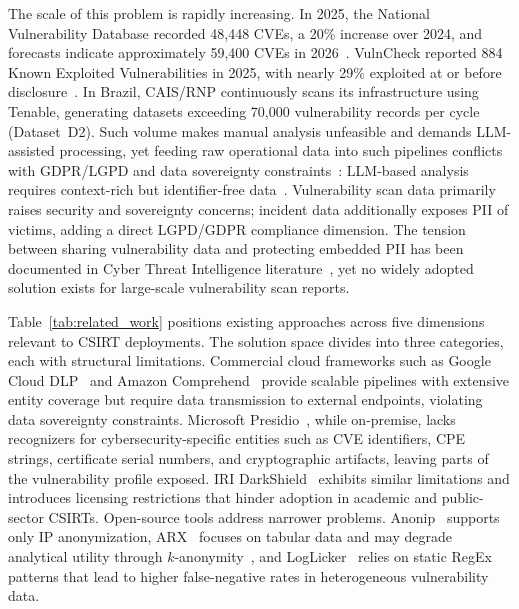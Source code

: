 \documentclass[12pt]{article}
\begin{document}
The scale of this problem is rapidly increasing. In 2025, the National Vulnerability Database recorded 48{,}448 CVEs, a 20\% increase over 2024, and forecasts indicate approximately 59{,}400 CVEs in 2026~\cite{cvedetails2025,FIRST2026}. VulnCheck reported 884 Known Exploited Vulnerabilities in 2025, with nearly 29\% exploited at or before disclosure~\cite{VulnCheck2026}. In Brazil, CAIS/RNP continuously scans its infrastructure using Tenable, generating datasets exceeding 70{,}000 vulnerability records per cycle (Dataset~D2). Such volume makes manual analysis unfeasible and demands LLM-assisted processing, yet feeding raw operational data into such pipelines conflicts with GDPR/LGPD and data sovereignty constraints~\cite{ANPD2024}: LLM-based analysis requires context-rich but identifier-free data~\cite{Bandel2025}. Vulnerability scan data primarily raises security and sovereignty concerns; incident data additionally exposes PII of victims, adding a direct LGPD/GDPR compliance dimension. The tension between sharing vulnerability data and protecting embedded PII has been documented in Cyber Threat Intelligence literature~\cite{Albakri2019,Nweke2020,Wagner2016}, yet no widely adopted solution exists for large-scale vulnerability scan reports.

Table~\ref{tab:related_work} positions existing approaches across five dimensions relevant to CSIRT deployments. The solution space divides into three categories, each with structural limitations. Commercial cloud frameworks such as Google Cloud DLP~\cite{GoogleDLP} and Amazon Comprehend~\cite{AmazonComprehend} provide scalable pipelines with extensive entity coverage but require data transmission to external endpoints, violating data sovereignty constraints. Microsoft Presidio~\cite{MicrosoftPresidio}, while on-premise, lacks recognizers for cybersecurity-specific entities such as CVE identifiers, CPE strings, certificate serial numbers, and cryptographic artifacts, leaving parts of the vulnerability profile exposed. IRI DarkShield~\cite{DarkShield} exhibits similar limitations and introduces licensing restrictions that hinder adoption in academic and public-sector CSIRTs. Open-source tools address narrower problems. Anonip~\cite{Anonip} supports only IP anonymization, ARX~\cite{Prasser2014} focuses on tabular data and may degrade analytical utility through $k$-anonymity~\cite{Slijep2021}, and LogLicker~\cite{LogLicker2023} relies on static RegEx patterns that lead to higher false-negative rates in heterogeneous vulnerability data.
\end{document}
